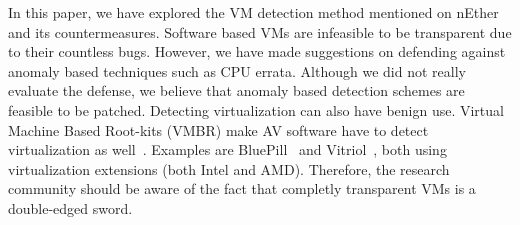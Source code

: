 In this paper, we have explored the VM detection method mentioned on nEther\cite{nether} and its countermeasures. Software based VMs are infeasible to be transparent due to their countless bugs. However, we have made suggestions on defending against anomaly based techniques such as CPU errata. Although we did not really evaluate the defense, we believe that anomaly based detection schemes are feasible to be patched.
Detecting virtualization can also have benign use. Virtual Machine Based Root-kits (VMBR) make AV software have to detect virtualization as well~\cite{thompson, ferrie2007}. Examples are BluePill~\cite{bluepill} and Vitriol~\cite{vitriol}, both using virtualization extensions (both Intel and AMD). Therefore, the research community should be aware of the fact that completly transparent VMs is a double-edged sword.

